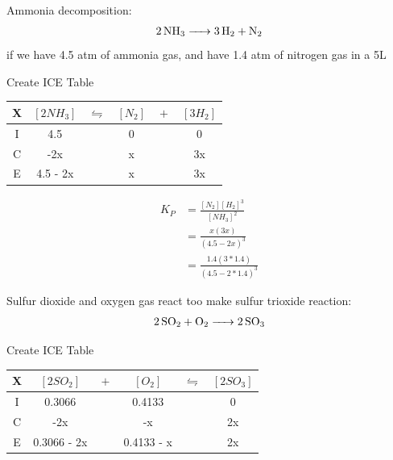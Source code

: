 \documentclass{article}  %
\begin{document}
Ammonia decomposition:
\begin{equation*}
    \begin{aligned}
        \ce{2NH3 -> 3H2 + N2}
    \end{aligned}
\end{equation*}
if we have 4.5 atm of ammonia gas, and have 1.4 atm of nitrogen gas in a 5L 

Create ICE Table \\
\begin{tabular}{c|c@{}c@{}c@{}c@{}c}
    \hline
    X   &   $[2NH_3]$ & ${}\leftrightharpoons{}$ & $[N_2]$ & ${}+{}$ & $[3H_2]$\\
    \hline
    I   &       4.5     &&   0                            &&  0       \\
    C   &       -2x      &&   x                           &&  3x      \\
    E   &   4.5 - 2x     &&   x                           &&  3x      \\
    \hline
\end{tabular}
\begin{equation*}
    \begin{aligned}
        K_P &= \frac{[N_2] [H_2]^3}{[NH_3]^2} \\
            &= \frac{x(3x)}{(4.5-2x)^3} \\
            &= \frac{1.4(3*1.4)}{(4.5-2*1.4)^3} 
    \end{aligned}
\end{equation*}

Sulfur dioxide and oxygen gas react too make sulfur trioxide reaction:
\begin{equation*}
    \begin{aligned}
        \ce{2SO2 + O2 -> 2SO3}
    \end{aligned}
\end{equation*}

Create ICE Table \\
\begin{tabular}{c|c@{}c@{}c@{}c@{}c}
    \hline
    X   &   $[2SO_2]$ & ${}+{}$ & $[O_2]$ & ${}\leftrightharpoons{}$ & $[2SO_3]$ \\
    \hline
    I   &       0.3066       &&   0.4133        &&  0       \\
    C   &       -2x      &&   -x        &&  2x      \\
    E   &       0.3066 - 2x     &&   0.4133 - x        &&  2x      \\
    \hline
\end{tabular}
\end{document}

